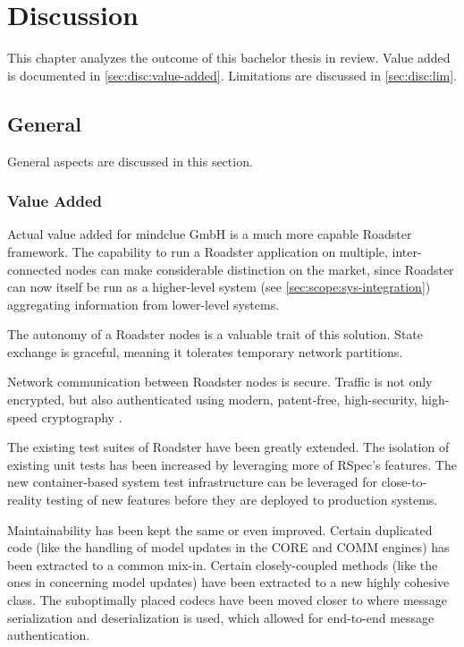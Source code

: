 \chapter{Discussion}
This chapter analyzes the outcome of this bachelor thesis in review.
Value added is documented in \autoref{sec:disc:value-added}. Limitations are
discussed in \autoref{sec:disc:lim}.

\section{General}
General aspects are discussed in this section.

\subsection{Value Added}\label{sec:disc:value-added}
Actual value added for mindclue GmbH is a much more capable Roadster framework.
The capability to run a Roadster application on multiple, inter-connected nodes
can make considerable distinction on the market, since Roadster can now itself
be run as a higher-level system (see \autoref{sec:scope:sys-integration})
aggregating information from lower-level
systems.

The autonomy of a Roadster nodes is a valuable trait of this solution. State
exchange is graceful, meaning it tolerates temporary network partitions.

Network communication between Roadster nodes is secure. Traffic is not only
encrypted, but also authenticated using modern, patent-free, high-security,
high-speed cryptography \cite{zmq:curvezmq}.

The existing test suites of Roadster have been greatly extended. The isolation
of existing unit tests has been increased by leveraging more of RSpec's
features.
The new container-based system test infrastructure can be leveraged for
close-to-reality testing of new features before they are deployed to production
systems.

Maintainability has been kept the same or even improved. Certain duplicated
code (like the handling of model updates in the CORE and COMM engines) has been extracted to a
common mix-in. Certain closely-coupled methods (like the ones in
 concerning model updates) have been extracted to a
new highly cohesive class. The suboptimally placed codecs have
been moved closer to where message serialization and deserialization is used,
which allowed for end-to-end message authentication.

